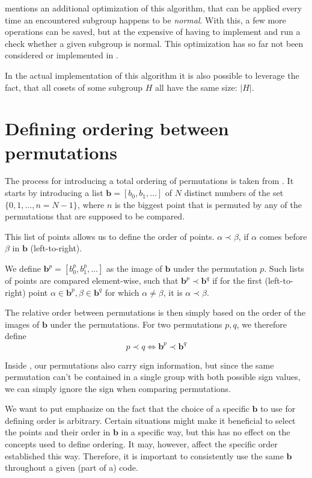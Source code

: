 \documentclass[parskip=half]{scrartcl}
\begin{document}
	\textcite{Butler1991a} mentions an additional optimization of this algorithm, that can be applied every time an encountered subgroup happens to be
	\emph{normal}. With this, a few more operations can be saved, but at the expensive of having to implement and run a check whether a given subgroup
	is normal. This optimization has so far not been considered or implemented in .

	In the actual implementation of this algorithm it is also possible to leverage the fact, that all cosets of some subgroup $H$ all have the same
	size: $|H|$.


	\section{Defining ordering between permutations}
	\label{sec:OrderPermutations}

	The process for introducing a total ordering of permutations is taken from \textcite{Manssur2002a}. It starts by introducing a list $\mathbf{b} =
	[b_0, b_1, \ldots]$ of $N$ distinct numbers of the set $\{ 0, 1, \ldots, n = N - 1 \}$, where $n$ is the biggest point that is permuted by any of
	the permutations that are supposed to be compared.

	This list of points allows us to define the order of points. $\alpha \prec \beta$, if $\alpha$ comes before $\beta$ in $\mathbf{b}$
	(left-to-right).\supercite{Manssur2002a}

	We define $\mathbf{b}^p = [ b_0^p, b_1^p, \ldots ]$ as the image of $\mathbf{b}$ under the permutation $p$. Such lists of points are compared
	element-wise, such that $\mathbf{b}^p \prec \mathbf{b}^q$ if for the first (left-to-right) point $\alpha \in \mathbf{b}^p, \beta \in \mathbf{b}^q$
	for which $\alpha \neq \beta$, it is $\alpha \prec \beta$.\supercite{Manssur2002a}

	The relative order between permutations is then simply based on the order of the images of $\mathbf{b}$ under the permutations. For two
	permutations $p,q$, we therefore define\supercite{Manssur2002a}
	\begin{equation}
		p \prec q \iff \mathbf{b}^p \prec \mathbf{b}^q
	\end{equation}

	Inside , our permutations also carry sign information, but since the same permutation can't be contained in a single group with both
	possible sign values\supercite{Manssur2002a}, we can simply ignore the sign when comparing permutations.\supercite{Manssur2002a}

	We want to put emphasize on the fact that the choice of a specific $\mathbf{b}$ to use for defining order is arbitrary. Certain situations might
	make it beneficial to select the points and their order in $\mathbf{b}$ in a specific way, but this has no effect on the concepts used to define
	ordering. It may, however, affect the specific order established this way. Therefore, it is important to consistently use the same $\mathbf{b}$
	throughout a given (part of a) code.


	\cleardoublepage
	\printbibliography
\end{document}
